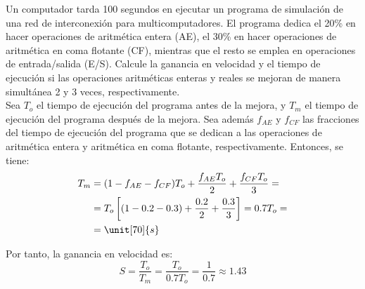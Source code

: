 \begin{ejercicio}
Un computador tarda 100 segundos en ejecutar un programa de simulación de una red de interconexión para multicomputadores. El programa dedica el 20\% en hacer operaciones de aritmética entera (AE), el 30\% en hacer operaciones de aritmética en coma flotante (CF), mientras que el resto se emplea en operaciones de entrada/salida (E/S). Calcule la ganancia en velocidad y el tiempo de ejecución si las operaciones aritméticas enteras y reales se mejoran de manera simultánea 2 y 3 veces, respectivamente.\\

Sea $T_o$ el tiempo de ejecución del programa antes de la mejora, y $T_m$ el tiempo de ejecución del programa después de la mejora. Sea además $f_{AE}$ y $f_{CF}$ las fracciones del tiempo de ejecución del programa que se dedican a las operaciones de aritmética entera y aritmética en coma flotante, respectivamente. Entonces, se tiene:
\begin{align*}
    T_m &= (1-f_{AE}-f_{CF})T_o + \dfrac{f_{AE}T_o}{2} + \dfrac{f_{CF}T_o}{3}
    =\\&= T_o\left[(1-0.2-0.3) + \dfrac{0.2}{2} + \dfrac{0.3}{3}\right]
    = 0.7T_o
    =\\&= \unit[70]{s}
\end{align*}

Por tanto, la ganancia en velocidad es:
\begin{equation*}
    S = \dfrac{T_o}{T_m} = \dfrac{T_o}{0.7T_o} = \frac{1}{0.7} \approx 1.43
\end{equation*}
\end{ejercicio}
\begin{comment}
SOLUCIÓN: El tiempo de ejecución del simulador en el sistema mejorado es de 70s. S=1,43.
\end{comment}

